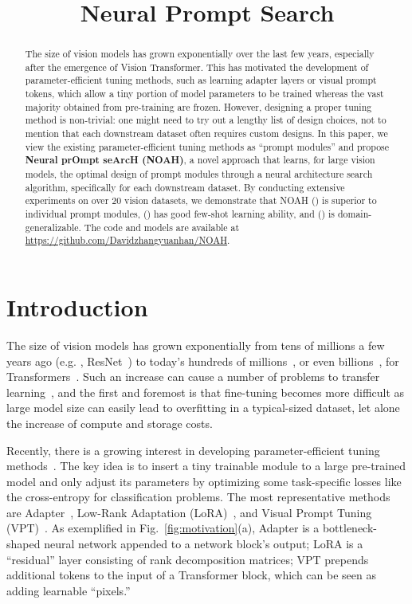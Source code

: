 \title{Neural Prompt Search}

\begin{abstract}
The size of vision models has grown exponentially over the last few years, especially after the emergence of Vision Transformer. This has motivated the development of parameter-efficient tuning methods, such as learning adapter layers or visual prompt tokens, which allow a tiny portion of model parameters to be trained whereas the vast majority obtained from pre-training are frozen. However, designing a proper tuning method is non-trivial: one might need to try out a lengthy list of design choices, not to mention that each downstream dataset often requires custom designs. In this paper, we view the existing parameter-efficient tuning methods as ``prompt modules'' and propose \textbf{Neural prOmpt seArcH (NOAH)}, a novel approach that learns, for large vision models, the optimal design of prompt modules through a neural architecture search algorithm, specifically for each downstream dataset. By conducting extensive experiments on over 20 vision datasets, we demonstrate that NOAH () is superior to individual prompt modules, () has good few-shot learning ability, and () is domain-generalizable. The code and models are available at \url{https://github.com/Davidzhangyuanhan/NOAH}.
\end{abstract}

\section{Introduction}

The size of vision models has grown exponentially from tens of millions a few years ago (e.g. , ResNet~\cite{he2016deep}) to today's hundreds of millions~\cite{dosovitskiy2020image}, or even billions~\cite{brown2020language,devlin2018bert,reed2022generalist}, for Transformers~\cite{vaswani2017attention}. Such an increase can cause a number of problems to transfer learning~\cite{houlsby2019parameter,jia2022visual}, and the first and foremost is that fine-tuning becomes more difficult as large model size can easily lead to overfitting in a typical-sized dataset, let alone the increase of compute and storage costs.

Recently, there is a growing interest in developing parameter-efficient tuning methods~\cite{houlsby2019parameter,hu2021lora,jia2022visual}. The key idea is to insert a tiny trainable module to a large pre-trained model and only adjust its parameters by optimizing some task-specific losses like the cross-entropy for classification problems. The most representative methods are Adapter~\cite{houlsby2019parameter}, Low-Rank Adaptation (LoRA)~\cite{hu2021lora}, and Visual Prompt Tuning (VPT)~\cite{jia2022visual}. As exemplified in Fig.~\ref{fig:motivation}(a), Adapter is a bottleneck-shaped neural network appended to a network block's output; LoRA is a ``residual'' layer consisting of rank decomposition matrices; VPT prepends additional tokens to the input of a Transformer block, which can be seen as adding learnable ``pixels.''


